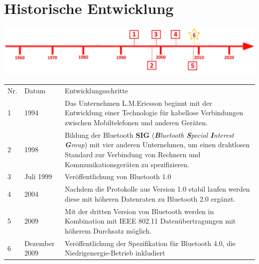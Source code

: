 \section*{Historische Entwicklung}
\includegraphics[width=\textwidth]{Kapitel/Bluetooth_4/Grafiken/Zeitstrahl.jpg}
\par
\noindent
{}
\begin{tabular}{p{0.5 cm}p{1.5 cm}p{15.55 cm}}
	Nr. & Datum & Entwicklungsschritte~\cite{Bluetooth_4.2}\\
	1 & 1994 & Das Unternehmen L.M.Ericsson beginnt mit der Entwicklung einer Technologie für kabellose Verbindungen zwischen Mobiltelefonen und anderen Geräten.\\
	2 & 1998 & Bildung der Bluetooth \textbf{SIG} (\textit{\textbf{B}luetooth \textbf{S}pecial \textbf{I}nterest \textbf{G}roup}) mit vier anderen Unternehmen, um einen drahtlosen Standard zur Verbindung von Rechnern und Kommunikationsgeräten zu spezifizieren.\\
	3 & Juli 1999 & Veröffentlichung von Bluetooth 1.0\\
	4 & 2004 & Nachdem die Protokolle aus Version 1.0 stabil laufen werden diese mit höheren Datenraten zu Bluetooth 2.0 ergänzt.\\
	5 & 2009 & Mit der dritten Version von Bluetooth werden in Kombination mit IEEE 802.11 Datenübertragungen mit höherem Durchsatz möglich.\\
	6 & Dezember 2009 & Veröffentlichung der Spezifikation für Bluetooth 4.0, die Niedrigenergie-Betrieb inkludiert\\
\end{tabular}
\par
